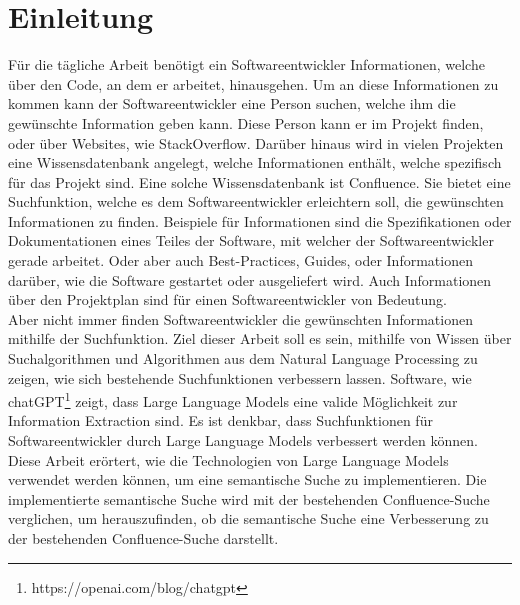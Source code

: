 \chapter{Einleitung}
Für die tägliche Arbeit benötigt ein Softwareentwickler Informationen, welche über den Code, an dem er arbeitet, hinausgehen.
Um an diese Informationen zu kommen kann der Softwareentwickler eine Person suchen, welche ihm die gewünschte Information geben kann.
Diese Person kann er im Projekt finden, oder über Websites, wie StackOverflow.
Darüber hinaus wird in vielen Projekten eine Wissensdatenbank angelegt, welche Informationen enthält, welche spezifisch für das Projekt sind.
Eine solche Wissensdatenbank ist Confluence.
Sie bietet eine Suchfunktion, welche es dem Softwareentwickler erleichtern soll, die gewünschten Informationen zu finden.
Beispiele für Informationen sind die Spezifikationen oder Dokumentationen eines Teiles der Software, mit welcher der Softwareentwickler gerade arbeitet.
Oder aber auch Best-Practices, Guides, oder Informationen darüber, wie die Software gestartet oder ausgeliefert wird.
Auch Informationen über den Projektplan sind für einen Softwareentwickler von Bedeutung.\\

Aber nicht immer finden Softwareentwickler die gewünschten Informationen mithilfe der Suchfunktion.
Ziel dieser Arbeit soll es sein, mithilfe von Wissen über Suchalgorithmen und Algorithmen aus dem Natural Language Processing zu zeigen, wie sich bestehende Suchfunktionen verbessern lassen.
Software, wie chatGPT\footnote{https://openai.com/blog/chatgpt} zeigt, dass Large Language Models eine valide Möglichkeit zur Information Extraction sind.
Es ist denkbar, dass Suchfunktionen für Softwareentwickler durch Large Language Models verbessert werden können.
Diese Arbeit erörtert, wie die Technologien von Large Language Models verwendet werden können, um eine semantische Suche zu implementieren.
Die implementierte semantische Suche wird mit der bestehenden Confluence-Suche verglichen, um herauszufinden, ob die semantische Suche eine Verbesserung zu der bestehenden Confluence-Suche darstellt.

